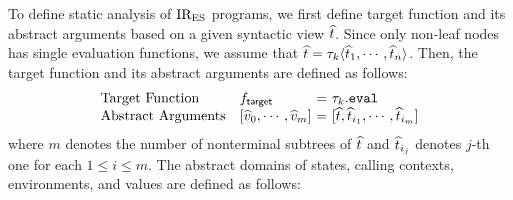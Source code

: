 To define static analysis of $\text{IR}_\text{ES}$ programs, we first define target function
and its abstract arguments based on a given syntactic view $\widehat{t}$.  Since only
non-leaf nodes has single evaluation functions, we assume that $\widehat{t} = \tau_k
\langle \widehat{t}_1, \cdots, \widehat{t}_n \rangle$.  Then, the target function and its
abstract arguments are defined as follows:
\[
  \begin{array}{ll@{~}c@{~}l}
    \text{Target Function} & \targetfunc &=& \ty_k.\eval\\

    \text{Abstract Arguments} &
    [\aval_0, \cdots, \aval_m] &=&
    [\atree, \atree_{i_1}, \cdots, \atree_{i_m}]\\
  \end{array}
\]
where $m$ denotes the number of nonterminal subtrees of $\widehat{t}$ and
$\widehat{t}_{i_j}$ denotes $j$-th one for each $1 \leq i \leq m$.  The abstract
domains of states, calling contexts, environments, and values are defined as
follows:
